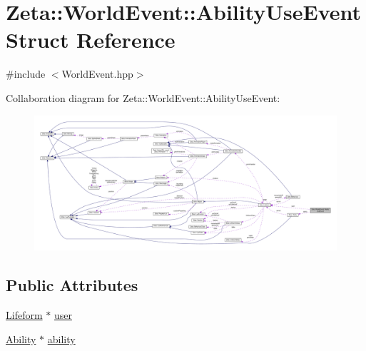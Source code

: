 \hypertarget{structZeta_1_1WorldEvent_1_1AbilityUseEvent}{\section{Zeta\+:\+:World\+Event\+:\+:Ability\+Use\+Event Struct Reference}
\label{structZeta_1_1WorldEvent_1_1AbilityUseEvent}
}


{\ttfamily \#include $<$World\+Event.\+hpp$>$}



Collaboration diagram for Zeta\+:\+:World\+Event\+:\+:Ability\+Use\+Event\+:
\nopagebreak
\begin{figure}[H]
\begin{center}
\leavevmode
\includegraphics[width=350pt]{structZeta_1_1WorldEvent_1_1AbilityUseEvent__coll__graph}
\end{center}
\end{figure}
\subsection*{Public Attributes}
\begin{DoxyCompactItemize}
\item 
\hyperlink{classZeta_1_1Lifeform}{Lifeform} $\ast$ \hyperlink{structZeta_1_1WorldEvent_1_1AbilityUseEvent_aab3be9afa99cc7fac216891e84abb3c1}{user}
\item 
\hyperlink{classZeta_1_1Ability}{Ability} $\ast$ \hyperlink{structZeta_1_1WorldEvent_1_1AbilityUseEvent_a2d31acd2e159683b69c3046e1c355000}{ability}
\end{DoxyCompactItemize}


